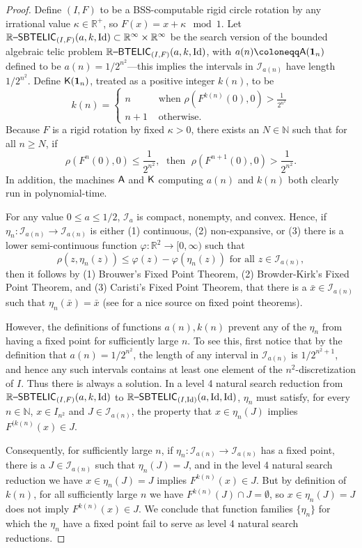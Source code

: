 \documentclass{amsart}
\theoremstyle{theorem}
\theoremstyle{remark}
\DeclareMathOperator{\Id}{Id}
\newcommand{\NN}{\mathbb{N}}
\newcommand{\RR}{\mathbb{R}}
\newcommand{\ccA}{\textsf{\upshape A}}
\newcommand{\ccK}{\textsf{\upshape K}}
\newcommand{\ccRBTELIC}{\mathbb{R}\textsf{\upshape --BTELIC}}
\newcommand{\ccRSBTELIC}{\mathbb{R}\textsf{\upshape --SBTELIC}}
\newcommand{\cI}{\mathcal{I}}
\begin{document}
\begin{proof}
Define $(I, F)$ to be a BSS-computable rigid circle rotation by any irrational value $\kappa \in \RR^+$, so $F(x) = x + \kappa \mod 1$.
Let $\ccRSBTELIC_{(I, F)}(a,k,\Id)\subset \RR^\infty \times \RR^\infty$ be the search version of the bounded algebraic telic problem $\ccRBTELIC_{(I, F)}(a,k,\Id)$, with $a(n)\coloneqq \ccA(\textbf{1}_n)$ defined to be $a(n) =1/2^{n^2}$---this implies the intervals in $\cI_{a(n)}$ have length $1/2^{n^2}$.
Define $\ccK(\textbf{1}_n)$, treated as a positive integer $k(n)$, to be
\[
k(n) = \begin{cases}
n &\text{ when } \rho(F^{k(n)}(0), 0) > \frac{1}{2^{n^2}}\\
n+1 &\text{ otherwise.}
\end{cases}
\]
Because $F$ is a rigid rotation by fixed $\kappa>0$, there exists an $N \in \NN$ such that for all $n \geq N$, if
\[
\rho(F^{n}(0), 0) \leq \frac{1}{2^{n^2}}, \;\text{ then }\; \rho(F^{n+1}(0), 0) > \frac{1}{2^{n^2}}.
\]
In addition, the machines $\ccA$ and $\ccK$ computing $a(n)$ and $k(n)$ both clearly run in polynomial-time.

For any value $0\leq a\leq 1/2$, $\cI_a$ is compact, nonempty, and convex.
Hence, if $\eta_n:\cI_{a(n)}\rightarrow \cI_{a(n)}$ is either (1) continuous, (2) non-expansive, or (3) there is a lower semi-continuous function $\varphi:\RR^2\rightarrow [0,\infty)$ such that
\[
\rho(z, \eta_n(z))\leq \varphi(z)-\varphi(\eta_n(z)) \text{ for all $z \in \cI_{a(n)}$},
\]
then it follows by (1) Brouwer's Fixed Point Theorem, (2) Browder-Kirk's Fixed Point Theorem, and (3) Caristi's Fixed Point Theorem, that there is a $\bar{x} \in \cI_{a(n)}$ such that $\eta_n(\bar{x}) = \bar{x}$ (see \cite{pata2019fixed} for a nice source on fixed point theorems).

However, the definitions of functions $a(n), k(n)$ prevent any of the $\eta_n$ from having a fixed point for sufficiently large $n$.
To see this, first notice that by the definition that $a(n) = 1/2^{n^2}$, the length of any interval in $\cI_{a(n)}$ is $1/2^{n^2+1}$, and hence any such intervals contains at least one element of the $n^2$-discretization of $I$.
Thus there is always a solution.
In a level 4 natural search reduction from $\ccRSBTELIC_{(I, F)}(a, k,\Id)$ to $\ccRSBTELIC_{(I, \Id)}(a, \Id,\Id)$, $\eta_n$ must satisfy, for every $n\in \NN$, $x \in I_{n^2}$ and $J \in \cI_{a(n)}$, the property that $x \in \eta_n(J)$ implies $F^{(k(n)}(x) \in J$.

Consequently, for sufficiently large $n$, if $\eta_n:\cI_{a(n)}\rightarrow \cI_{a(n)}$ has a fixed point, there is a $J \in \cI_{a(n)}$ such that $\eta_n(J) = J$, and in the level 4 natural search reduction we have $x \in \eta_n(J)=J$ implies $F^{k(n)}(x) \in J$.
But by definition of $k(n)$, for all sufficiently large $n$ we have $F^{k(n)}(J) \cap J = \emptyset$, so $x \in \eta_n(J)=J$ does not imply $F^{k(n)}(x) \in J$. We conclude that function families $\{\eta_n\}$ for which the $\eta_n$ have a fixed point fail to serve as level 4 natural search reductions.
\end{proof}
\end{document}
